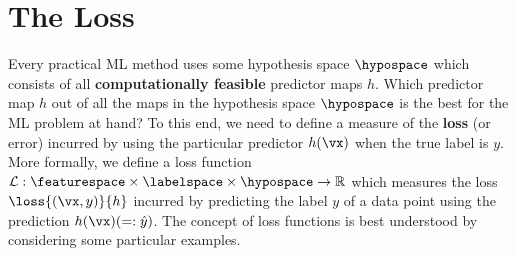 \documentclass[12pt]{report}
\begin{document}

\section{The Loss}
\label{sec_lossfct}

Every practical ML method uses some hypothesis space $\hypospace$ which consists 
of all {\bf computationally feasible} predictor maps $h$. Which predictor map $h$ out of 
all the maps in the hypothesis space $\hypospace$ is the best for the ML problem at hand?
To this end, we need to define a measure of the {\bf loss} (or error) incurred by using 
the particular predictor $h(\vx)$ when the true label is $y$. More formally, we define a 
loss function $\mathcal{L}: \featurespace \times \labelspace \times \hypospace \rightarrow \mathbb{R}$ 
which measures the loss $\loss{(\vx,y)}{h}$ incurred by predicting the label $y$ of a data point using the prediction $h(\vx)(=: \hat{y})$. 
The concept of loss functions is best understood by considering some particular examples. 
\end{document}
